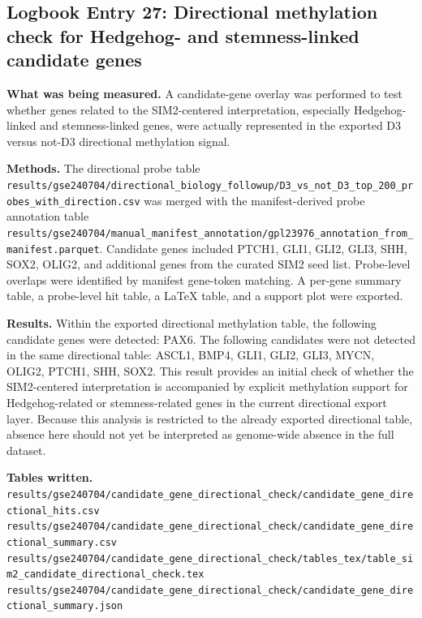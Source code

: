\subsection*{Logbook Entry 27: Directional methylation check for Hedgehog- and stemness-linked candidate genes}

\textbf{What was being measured.}
A candidate-gene overlay was performed to test whether genes related to the SIM2-centered interpretation, especially Hedgehog-linked and stemness-linked genes, were actually represented in the exported D3 versus not-D3 directional methylation signal.

\textbf{Methods.}
The directional probe table
\texttt{results/gse240704/directional\_biology\_followup/D3\_vs\_not\_D3\_top\_200\_probes\_with\_direction.csv}
was merged with the manifest-derived probe annotation table
\texttt{results/gse240704/manual\_manifest\_annotation/gpl23976\_annotation\_from\_manifest.parquet}.
Candidate genes included PTCH1, GLI1, GLI2, GLI3, SHH, SOX2, OLIG2, and additional genes from the curated SIM2 seed list. Probe-level overlaps were identified by manifest gene-token matching. A per-gene summary table, a probe-level hit table, a LaTeX table, and a support plot were exported.

\textbf{Results.}
Within the exported directional methylation table, the following candidate genes were detected: PAX6.
The following candidates were not detected in the same directional table: ASCL1, BMP4, GLI1, GLI2, GLI3, MYCN, OLIG2, PTCH1, SHH, SOX2.
This result provides an initial check of whether the SIM2-centered interpretation is accompanied by explicit methylation support for Hedgehog-related or stemness-related genes in the current directional export layer. Because this analysis is restricted to the already exported directional table, absence here should not yet be interpreted as genome-wide absence in the full dataset.

\textbf{Tables written.}
\texttt{results/gse240704/candidate\_gene\_directional\_check/candidate\_gene\_directional\_hits.csv}\\
\texttt{results/gse240704/candidate\_gene\_directional\_check/candidate\_gene\_directional\_summary.csv}\\
\texttt{results/gse240704/candidate\_gene\_directional\_check/tables\_tex/table\_sim2\_candidate\_directional\_check.tex}\\
\texttt{results/gse240704/candidate\_gene\_directional\_check/candidate\_gene\_directional\_summary.json}

